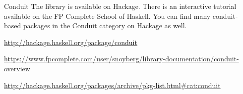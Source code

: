 \begin{hcarentry}[updated]{Conduit}
The library is available on Hackage. There is an interactive tutorial available on the FP Complete School of Haskell. You can find many conduit-based packages in the Conduit category on Hackage as well.

\FurtherReading
\begin{compactitem}
\item \url{http://hackage.haskell.org/package/conduit}
\item \url{https://www.fpcomplete.com/user/snoyberg/library-documentation/conduit-overview}
\item \url{http://hackage.haskell.org/packages/archive/pkg-list.html#cat:conduit}
\end{compactitem}
\end{hcarentry}
